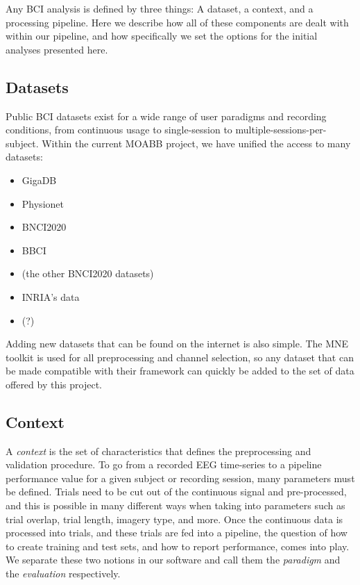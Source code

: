 Any BCI analysis is defined by three things: A dataset, a context, and a processing pipeline. Here we describe how all of these components are dealt with within our pipeline, and how specifically we set the options for the initial analyses presented here. 

\subsection{Datasets}

Public BCI datasets exist for a wide range of user paradigms and recording
conditions, from continuous usage to single-session to
multiple-sessions-per-subject. Within the current MOABB project, we have unified
the access to many datasets:


\begin{itemize}
\item GigaDB \cite{Cho2017}
\item Physionet\cite{Schalk2004,Goldberger2000} 
\item BNCI2020
\item BBCI \cite{Blankertz2007,Shin2017}
\item (the other BNCI2020 datasets)
\item INRIA's data
\item (?)
\end{itemize}

Adding new datasets that can be found on the internet is also simple. The MNE toolkit\cite{Gramfort2014,Gramfort2013} is used for all preprocessing and channel selection, so any dataset that can be made compatible with their framework can quickly be added to the set of data offered by this project.

\subsection{Context}

A \emph{context} is the set of characteristics that defines the preprocessing
and validation procedure. To go from a recorded EEG time-series to a pipeline
performance value for a given subject or recording session, many parameters must
be defined. Trials need to be cut out of the continuous signal and
pre-processed, and this is possible in many different ways when taking into
parameters such as trial overlap, trial length, imagery type, and more. Once the
continuous data is processed into trials, and these trials are fed into a
pipeline, the question of how to create training and test sets, and how to
report performance, comes into play. We separate these two notions in our
software and call them the \emph{paradigm} and the \emph{evaluation}
respectively.

